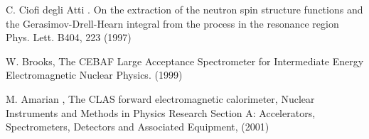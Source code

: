  C. Ciofi degli Atti \etal. 
       On the extraction of the neutron spin structure functions and the Gerasimov-Drell-Hearn integral from the process in the resonance region
       Phys. Lett. B404, 223 (1997)

 W. Brooks, The CEBAF Large Acceptance Spectrometer for Intermediate Energy Electromagnetic Nuclear Physics. %
                     (1999)

        M. Amarian \etal, The {CLAS} forward electromagnetic calorimeter,
        Nuclear Instruments and Methods in Physics Research Section A: Accelerators, Spectrometers, Detectors and Associated Equipment, (2001)


